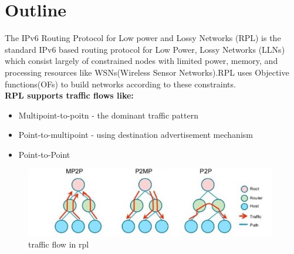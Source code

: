 \section{Outline} \label{Outline}
The IPv6 Routing Protocol for Low power and Lossy Networks (RPL) is the standard IPv6 based routing protocol for Low Power, Lossy Networks (LLNs) which consist largely of constrained nodes with limited power, memory, and processing resources like WSNs(Wireless Sensor Networks).RPL uses Objective functions(OFs) to build networks according to these constraints.\\
\noindent\textbf{RPL supports traffic flows like:\\}
\vspace{-1cm}
\begin{itemize}
\item Multipoint-to-poitn - the dominant traffic pattern
\item Point-to-multipoint - using destination advertisement mechanism
\item Point-to-Point
\end{itemize}
\begin{figure}[h!]
\centering
\includegraphics[width=110mm]{traffic flow in rpl.png}
\caption{traffic flow in rpl}
\end{figure}
